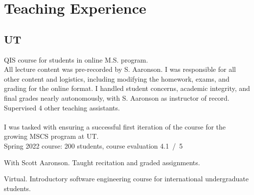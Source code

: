 \documentclass[11pt,letterpaper,serif]{moderncv}
\begin{document}




\section{Teaching Experience}
\subsection{UT}
{
	\begin{adjustwidth}{.25in}{}
		QIS course for students in online M.S. program.\\
		All lecture content was pre-recorded by S. Aaronson. I was responsible for all other content and logistics, including modifying the homework, exams, and grading for the online format.
		I handled student concerns, academic integrity, and final grades nearly autonomously, with S. Aaronson as instructor of record.\\
		Supervised 4 other teaching assistants.\\
		~\\
		I was tasked with ensuring a successful first iteration of the course for the growing MSCS program at UT. \\
		Spring 2022 course: 200 students, course evaluation 4.1~/~5
	\end{adjustwidth}
}


{
	\begin{adjustwidth}{.25in}{}
	With Scott Aaronson. Taught recitation and graded assignments.
	\end{adjustwidth}
}

{
	\begin{adjustwidth}{.25in}{}
		Virtual. Introductory software engineering course for international undergraduate students.
	\end{adjustwidth}
}
\end{document}
